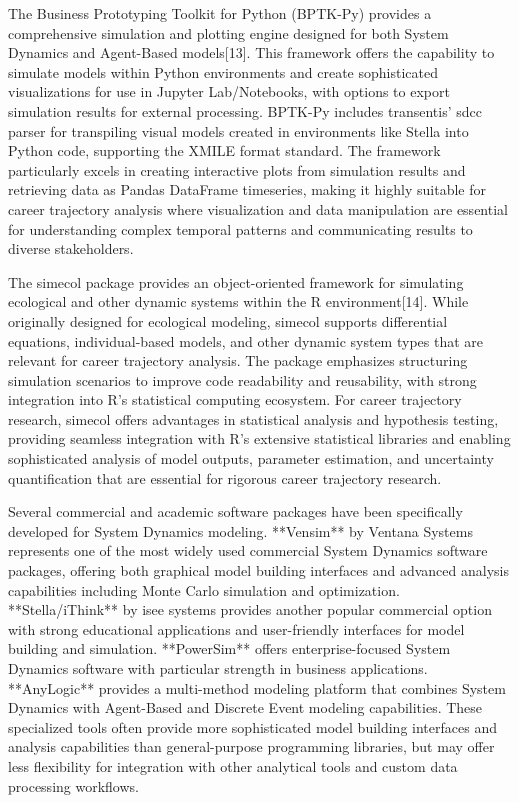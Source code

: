 \documentclass[main.tex]{subfiles}
\begin{document}

The Business Prototyping Toolkit for Python (BPTK-Py) provides a comprehensive simulation and plotting engine designed for both System Dynamics and Agent-Based models[13]. This framework offers the capability to simulate models within Python environments and create sophisticated visualizations for use in Jupyter Lab/Notebooks, with options to export simulation results for external processing. BPTK-Py includes transentis' sdcc parser for transpiling visual models created in environments like Stella into Python code, supporting the XMILE format standard. The framework particularly excels in creating interactive plots from simulation results and retrieving data as Pandas DataFrame timeseries, making it highly suitable for career trajectory analysis where visualization and data manipulation are essential for understanding complex temporal patterns and communicating results to diverse stakeholders.


The simecol package provides an object-oriented framework for simulating ecological and other dynamic systems within the R environment[14]. While originally designed for ecological modeling, simecol supports differential equations, individual-based models, and other dynamic system types that are relevant for career trajectory analysis. The package emphasizes structuring simulation scenarios to improve code readability and reusability, with strong integration into R's statistical computing ecosystem. For career trajectory research, simecol offers advantages in statistical analysis and hypothesis testing, providing seamless integration with R's extensive statistical libraries and enabling sophisticated analysis of model outputs, parameter estimation, and uncertainty quantification that are essential for rigorous career trajectory research.


Several commercial and academic software packages have been specifically developed for System Dynamics modeling. **Vensim** by Ventana Systems represents one of the most widely used commercial System Dynamics software packages, offering both graphical model building interfaces and advanced analysis capabilities including Monte Carlo simulation and optimization. **Stella/iThink** by isee systems provides another popular commercial option with strong educational applications and user-friendly interfaces for model building and simulation. **PowerSim** offers enterprise-focused System Dynamics software with particular strength in business applications. **AnyLogic** provides a multi-method modeling platform that combines System Dynamics with Agent-Based and Discrete Event modeling capabilities. These specialized tools often provide more sophisticated model building interfaces and analysis capabilities than general-purpose programming libraries, but may offer less flexibility for integration with other analytical tools and custom data processing workflows.
\end{document}
